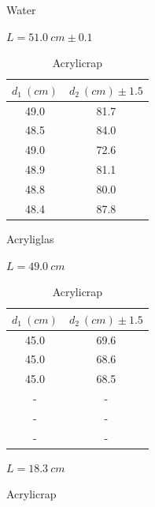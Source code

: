 \documentclass{amsart}
\begin{document}
\begin{table}[H]
    \begin{minipage}{0.3\textwidth}
        \centering
        \caption{Water}
        \vspace{-0.2cm}
        $L = 51.0\ \unit{cm} \pm 0.1$
        \vspace{0.3cm}
        \label{my-label}
        \begin{tabular}{c|c}
        $d_1 \unit{\ (cm)}$ & $d_2 \unit{\ (cm)} \pm 1.5$ \\ \hline
        49.0            & 81.7                    \\
        48.5            & 84.0                    \\
        49.0            & 72.6                    \\
        48.9            & 81.1                    \\
        48.8            & 80.0                    \\
        48.4            & 87.8
        \end{tabular}
    \end{minipage}
    \begin{minipage}{0.3\textwidth}
        \centering
        \caption{Acryliglas}
        \vspace{-0.2cm}
        $L = 49.0 \ \unit{cm}$
        \vspace{0.3cm}
        \label{my-label}
        \begin{tabular}{c|c}
        $d_1 \unit{\ (cm)}$        & $d_2 \unit{\ (cm)} \pm 1.5$ \\ \hline
        45.0                   & 69.6                    \\
        45.0                   & 68.6                    \\
        45.0                   & 68.5                    \\
        - & - \\
        - & - \\
        - & - \\
        \end{tabular}
    \end{minipage}
    \begin{minipage}{0.3\textwidth}
        \centering
        \caption{Acrylicrap}
        \vspace{-0.2cm}
        $L = 18.3 \ \unit{cm}$
        \vspace{0.3cm}
        \label{my-label}
        \begin{tabular}{c|c}

\end{tabular}
\end{minipage}
\end{table}
\end{document}
